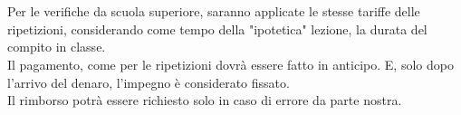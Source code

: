 \section*{\scalebox{1.5}{VERIFICHE}}
Per le verifiche da scuola superiore, saranno applicate le stesse tariffe delle ripetizioni, considerando come tempo della "ipotetica" lezione, la durata del compito in classe.\\
Il pagamento, come per le ripetizioni dovrà essere fatto in anticipo. E, solo dopo l'arrivo del denaro, l'impegno è considerato fissato.\\
Il rimborso potrà essere richiesto solo in caso di errore da parte nostra.